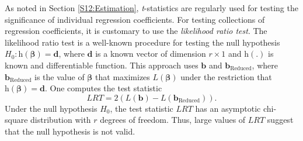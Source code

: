 As noted in Section \ref{S12:Estimation}, \textit{t}-statistics are
regularly used for testing the significance of individual regression
coefficients. For testing collections of regression coefficients, it
is customary to use the \emph{likelihood ratio test}. The likelihood
ratio test is a well-known procedure for testing the null hypothesis
$H_0:\mathrm{h}(\boldsymbol \beta) = \mathbf{d}$, where $\mathbf{d}$
is a known vector of dimension $r\times 1$ and
$\mathrm{h}(\mathbf{.})$ is known and differentiable function. This
approach uses $\mathbf{b}$ and $\mathbf{b}_{\mathrm{Reduced}}$,
where $\mathbf{b}_{\mathrm{Reduced}}$ is the value of $\boldsymbol
\beta$ that maximizes $L(\boldsymbol \beta)$ under the restriction
that $\mathrm{h}(\boldsymbol \beta)=\mathbf{d}$. One computes the
test statistic
\begin{equation}\label{E12:LRT}
LRT = 2 \left( L(\mathbf{b}) - L(\mathbf{b}_{\mathrm{Reduced}})
\right) .
\end{equation}
Under the null hypothesis $H_0$, the test statistic $LRT$ has an
asymptotic chi-square distribution with $r$ degrees of freedom.
Thus, large values of $LRT$ suggest that the null hypothesis is not
valid.

